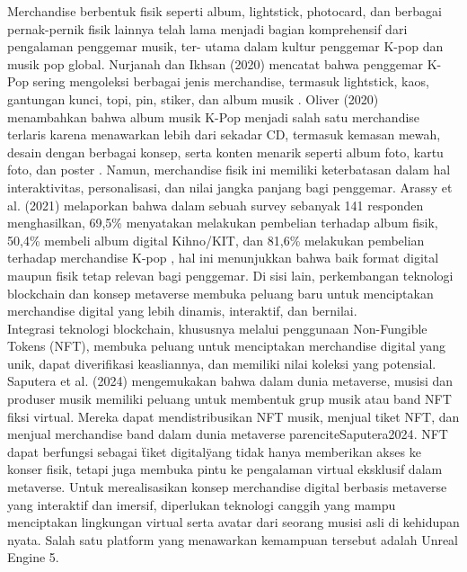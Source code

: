 Merchandise berbentuk fisik seperti album, lightstick, photocard, dan berbagai pernak-pernik fisik lainnya telah lama menjadi bagian
komprehensif dari pengalaman penggemar musik, ter- utama dalam kultur penggemar K-pop dan musik pop global. Nurjanah dan
Ikhsan (2020) mencatat bahwa penggemar K-Pop sering mengoleksi berbagai jenis merchandise, termasuk lightstick, kaos,
gantungan kunci, topi, pin, stiker, dan album musik \parencite{Nurjanah2020}. Oliver (2020) menambahkan bahwa album musik K-Pop menjadi 
salah satu merchandise terlaris karena menawarkan lebih dari sekadar CD, termasuk kemasan mewah, desain dengan berbagai
konsep, serta konten menarik seperti album foto, kartu foto, dan poster \parencite{Oliver2020}. Namun, merchandise fisik ini memiliki 
keterbatasan dalam hal interaktivitas, personalisasi, dan nilai jangka panjang bagi penggemar. Arassy et al. (2021)
melaporkan bahwa dalam sebuah survey sebanyak 141 responden menghasilkan, 69,5\% menyatakan melakukan pembelian terhadap
album fisik, 50,4\% membeli album digital Kihno/KIT, dan 81,6\% melakukan pembelian terhadap merchandise K-pop \parencite{Saputera2024},
hal ini menunjukkan bahwa baik format digital maupun fisik tetap relevan bagi penggemar. Di sisi lain, perkembangan teknologi
blockchain dan konsep metaverse membuka peluang baru untuk menciptakan merchandise digital yang lebih dinamis, interaktif, dan
bernilai.
\\

Integrasi teknologi blockchain, khususnya melalui penggunaan Non-Fungible Tokens (NFT), membuka peluang untuk menciptakan 
merchandise digital yang unik, dapat diverifikasi keasliannya, dan memiliki nilai koleksi yang potensial. Saputera et al. 
(2024) mengemukakan bahwa dalam dunia metaverse, musisi dan produser musik memiliki peluang untuk membentuk grup musik atau
band NFT fiksi virtual. Mereka dapat mendistribusikan NFT musik, menjual tiket NFT, dan menjual merchandise band dalam 
dunia metaverse parencite{Saputera2024}. NFT dapat berfungsi sebagai \"tiket digital\" yang tidak hanya memberikan akses ke konser fisik, 
tetapi juga membuka pintu ke pengalaman virtual eksklusif dalam metaverse. Untuk merealisasikan konsep merchandise digital
berbasis metaverse yang interaktif dan imersif, diperlukan teknologi canggih yang mampu menciptakan lingkungan virtual 
serta avatar dari seorang musisi asli di kehidupan nyata. Salah satu platform yang menawarkan kemampuan tersebut adalah 
Unreal Engine 5.
\\

